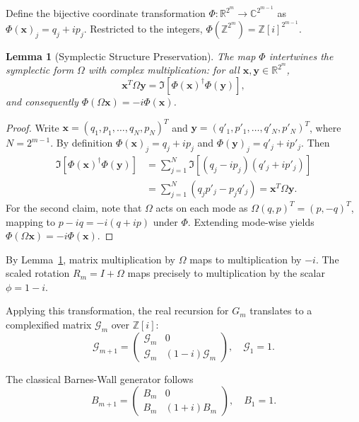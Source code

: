 \documentclass[aps,prl,twocolumn,superscriptaddress]{revtex4-2}
\newtheorem{lemma}{Lemma}
\newcommand{\symp}{\Omega}
\newcommand{\bvec}[1]{\boldsymbol{#1}}
\begin{document}
Define the bijective coordinate transformation $\Phi: \mathbb{R}^{2^m} \to \mathbb{C}^{2^{m-1}}$ as $\Phi(\bvec{x})_j = q_j + i p_j$. Restricted to the integers, $\Phi(\mathbb{Z}^{2^m}) = \mathbb{Z}[i]^{2^{m-1}}$.

\begin{lemma}[Symplectic Structure Preservation]\label{lem:symp-preserve}
The map $\Phi$ intertwines the symplectic form $\symp$ with complex multiplication: for all $\bvec{x}, \bvec{y} \in \mathbb{R}^{2^m}$,
\begin{equation}
\bvec{x}^T \symp \bvec{y} = \Im\left[\Phi(\bvec{x})^\dagger \Phi(\bvec{y})\right],
\end{equation}
and consequently $\Phi(\symp \bvec{x}) = -i \Phi(\bvec{x})$.
\end{lemma}

\begin{proof}
Write $\bvec{x} = (q_1, p_1, \dots, q_N, p_N)^T$ and $\bvec{y} = (q'_1, p'_1, \dots, q'_N, p'_N)^T$, where $N = 2^{m-1}$. By definition $\Phi(\bvec{x})_j = q_j + i p_j$ and $\Phi(\bvec{y})_j = q'_j + i p'_j$. Then
\begin{align}
\Im\left[\Phi(\bvec{x})^\dagger \Phi(\bvec{y})\right]
&= \sum_{j=1}^N \Im\left[(q_j - i p_j)(q'_j + i p'_j)\right] \nonumber \\
&= \sum_{j=1}^N (q_j p'_j - p_j q'_j)
 = \bvec{x}^T \symp \bvec{y}.
\end{align}
For the second claim, note that $\symp$ acts on each mode as $\symp (q, p)^T = (p, -q)^T$, mapping to $p - i q = -i(q + i p)$ under $\Phi$. Extending mode-wise yields $\Phi(\symp \bvec{x}) = -i \Phi(\bvec{x})$.
\end{proof}

By Lemma~\ref{lem:symp-preserve}, matrix multiplication by $\symp$ maps to multiplication by $-i$. The scaled rotation $R_m = I + \symp$ maps precisely to multiplication by the scalar $\phi = 1 - i$.

Applying this transformation, the real recursion for $G_m$ translates to a complexified matrix $\mathcal{G}_m$ over $\mathbb{Z}[i]$:
\begin{equation}
\mathcal{G}_{m+1} = \begin{pmatrix} \mathcal{G}_m & 0 \\ \mathcal{G}_m & (1-i)\mathcal{G}_m \end{pmatrix}, \quad \mathcal{G}_1 = 1.
\end{equation}

The classical Barnes-Wall generator follows
\begin{equation}
B_{m+1} = \begin{pmatrix} B_m & 0 \\ B_m & (1+i)B_m \end{pmatrix}, \quad B_1 = 1.
\end{equation}
\end{document}

